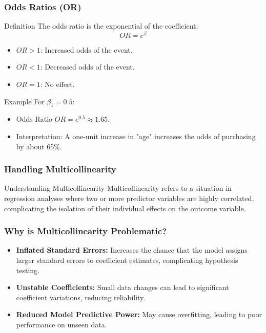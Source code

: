\documentclass[aspectratio=169]{beamer}
\begin{document}
\begin{frame}[fragile]
    \frametitle{Odds Ratios (OR)}
    \begin{block}{Definition}
        The odds ratio is the exponential of the coefficient:
        \[
        OR = e^{\beta}
        \]
    \end{block}
    \begin{itemize}
        \item $OR > 1$: Increased odds of the event.
        \item $OR < 1$: Decreased odds of the event.
        \item $OR = 1$: No effect.
    \end{itemize}
    
    \begin{block}{Example}
        For $\beta_1 = 0.5$:
        \begin{itemize}
            \item Odds Ratio $OR = e^{0.5} \approx 1.65$.
            \item Interpretation: A one-unit increase in "age" increases the odds of purchasing by about 65\%.
        \end{itemize}
    \end{block}
\end{frame}

\begin{frame}[fragile]
    \frametitle{Handling Multicollinearity}
    \begin{block}{Understanding Multicollinearity}
        Multicollinearity refers to a situation in regression analyses where two or more predictor variables are highly correlated, complicating the isolation of their individual effects on the outcome variable.
    \end{block}
\end{frame}

\begin{frame}[fragile]
    \frametitle{Why is Multicollinearity Problematic?}
    \begin{itemize}
        \item \textbf{Inflated Standard Errors:} Increases the chance that the model assigns larger standard errors to coefficient estimates, complicating hypothesis testing.
        \item \textbf{Unstable Coefficients:} Small data changes can lead to significant coefficient variations, reducing reliability.
        \item \textbf{Reduced Model Predictive Power:} May cause overfitting, leading to poor performance on unseen data.
    \end{itemize}
\end{frame}
\end{document}
